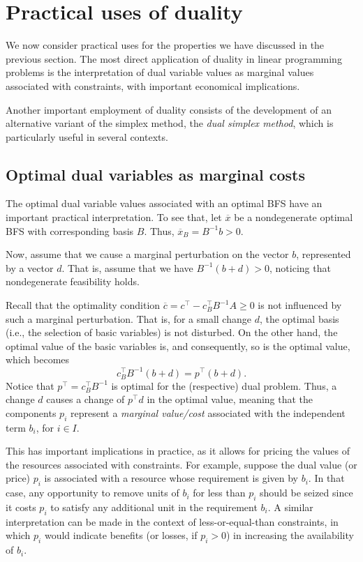 \section{Practical uses of duality}

We now consider practical uses for the properties we have discussed in the previous section. The most direct application of duality in linear programming problems is the interpretation of dual variable values as marginal values associated with constraints, with important economical implications. 

Another important employment of duality consists of the development of an alternative variant of the simplex method, the \emph{dual simplex method}, which is particularly useful in several contexts.



\subsection{Optimal dual variables as marginal costs}

The optimal dual variable values associated with an optimal BFS have an important practical interpretation. To see that, let $\overline{x}$ be a nondegenerate optimal BFS with corresponding basis $B$. Thus, $\overline{x}_B = B^{-1}b > 0$.

Now, assume that we cause a marginal perturbation on the vector $b$, represented by a vector $d$. That is, assume that we have $B^{-1}(b + d) > 0$, noticing that nondegenerate feasibility holds.

Recall that the optimality condition $\overline{c} = c^\top - c_B ^\top B^{-1}A \geq 0$ is not influenced by such a marginal perturbation. That is, for a small change $d$, the optimal basis (i.e., the selection of basic variables) is not disturbed. On the other hand, the optimal value of the basic variables is, and consequently, so is the optimal value, which becomes
%
\begin{equation*}
	c_B^\top B^{-1}(b + d) = p^\top(b + d). 
\end{equation*}
%
Notice that $p^\top = c_B^\top B^{-1}$ is optimal for the (respective) dual problem. Thus, a change $d$ causes a change of $p^\top d$ in the optimal value, meaning that the components $p_i$ represent a \emph{marginal value/cost} associated with the independent term $b_i$, for $i \in I$. 

This has important implications in practice, as it allows for pricing the values of the resources associated with constraints. For example, suppose the dual value (or price) $p_i$ is associated with a resource whose requirement is given by $b_i$. In that case, any opportunity to remove units of $b_i$ for less than $p_i$ should be seized since it costs $p_i$ to satisfy any additional unit in the requirement $b_i$. A similar interpretation can be made in the context of less-or-equal-than constraints, in which $p_i$ would indicate benefits (or losses, if $p_i > 0$) in increasing the availability of $b_i$. 

